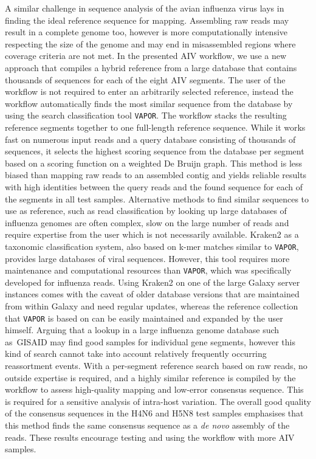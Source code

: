 A similar challenge in sequence analysis of the avian influenza virus lays in finding the ideal reference sequence for mapping. Assembling raw reads may result in a complete genome too, however is more computationally intensive respecting the size of the genome and may end in misassembled regions where coverage criteria are not met. In the presented \ac{AIV} workflow, we use a new approach that compiles a hybrid reference from a large database that contains thousands of sequences for each of the eight \ac{AIV} segments. The user of the workflow is not required to enter an arbitrarily selected reference, instead the workflow automatically finds the most similar sequence from the database by using the search classification tool \texttt{VAPOR}. The workflow stacks the resulting reference segments together to one full-length reference sequence. While it works fast on numerous input reads and a query database consisting of thousands of sequences, it selects the highest scoring sequence from the database per segment based on a scoring function on a weighted De Bruijn graph. This method is less biased than mapping raw reads to an assembled contig and yields reliable results with high identities between the query reads and the found sequence for each of the segments in all test samples. Alternative methods to find similar sequences to use as reference, such as read classification by looking up large databases of influenza genomes are often complex, slow on the large number of reads and require expertise from the user which is not necessarily available. Kraken2 as a taxonomic classification system, also based on k-mer matches similar to \texttt{VAPOR}, provides large databases of viral sequences. However, this tool requires more maintenance and computational resources than \texttt{VAPOR}, which was specifically developed for influenza reads. Using Kraken2 on one of the large Galaxy server instances comes with the caveat of older database versions that are maintained from within Galaxy and need regular updates, whereas the reference collection that \texttt{VAPOR} is based on can be easily maintained and expanded by the user himself. Arguing that a lookup in a large influenza genome database such as~\ac{GISAID} may find good samples for individual gene segments, however this kind of search cannot take into account relatively frequently occurring reassortment events. With a per-segment reference search based on raw reads, no outside expertise is required, and a highly similar reference is compiled by the workflow to assess high-quality mapping and low-error consensus sequence. This is required for a sensitive analysis of intra-host variation. The overall good quality of the consensus sequences in the H4N6 and H5N8 test samples emphasises that this method finds the same consensus sequence as a \textit{de novo} assembly of the reads. These results encourage testing and using the workflow with more \ac{AIV} samples.\\
